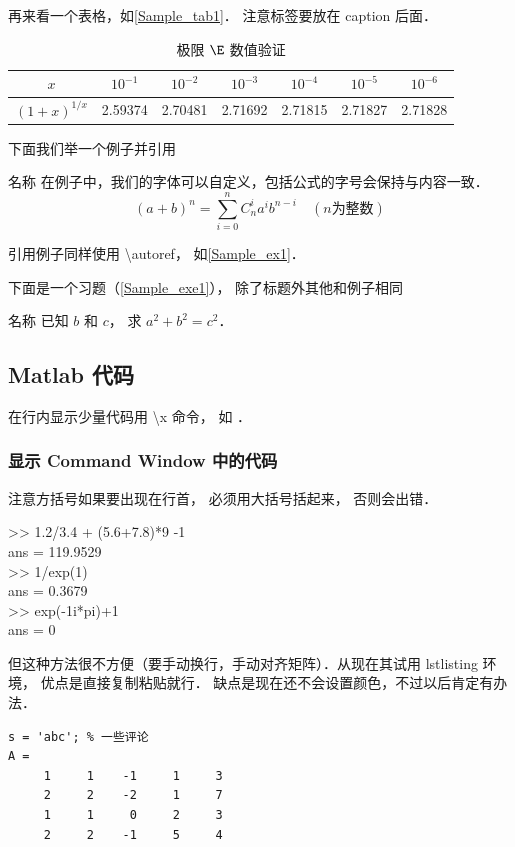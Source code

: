 再来看一个表格，如\autoref{Sample_tab1}． 注意标签要放在 caption 后面．
\begin{table}[ht]
\centering
\caption{极限 $\E$ 数值验证}\label{Sample_tab1}
\begin{tabular}{|c|c|c|c|c|c|c|}
\hline
$x$ & ${10^{ - 1}}$ & ${10^{ - 2}}$ & ${10^{ - 3}}$ & ${10^{ - 4}}$ & ${10^{ - 5}}$ & ${10^{ - 6}}$ \\
\hline
$(1 + x)^{1/x}$ & 2.59374 & 2.70481 & 2.71692 & 2.71815 & 2.71827 & 2.71828 \\
\hline
\end{tabular}
\end{table}

下面我们举一个例子并引用

\begin{exam}{名称}\label{Sample_ex1}
在例子中，我们的字体可以自定义，包括公式的字号会保持与内容一致．
\begin{equation}
(a+b)^n = \sum_{i=0}^n C_n^i a^i b^{n-i} \quad (n\text{为整数})
\end{equation}
\end{exam}
引用例子同样使用 \textbackslash autoref， 如\autoref{Sample_ex1}． 

下面是一个习题（\autoref{Sample_exe1}）， 除了标题外其他和例子相同
\begin{exer}{名称}\label{Sample_exe1}
已知 $b$ 和 $c$， 求 $a^2 + b^2 = c^2$．
\end{exer}

\subsection{Matlab 代码}
在行内显示少量代码用 \textbackslash x 命令， 如 ．
\subsubsection{显示  Command Window 中的代码}
注意方括号如果要出现在行首， 必须用大括号括起来， 否则会出错．
\begin{Command}
>> 1.2/3.4 + (5.6+7.8)*9 -1 \\
ans = 119.9529 \\
>> 1/exp(1) \\
ans = 0.3679 \\
>> exp(-1i*pi)+1 \\
ans = 0
\end{Command}

但这种方法很不方便（要手动换行，手动对齐矩阵）．从现在其试用 lstlisting 环境， 优点是直接复制粘贴就行． 缺点是现在还不会设置颜色，不过以后肯定有办法．
\begin{lstlisting}[language=plain]
s = 'abc'; % 一些评论
A =
     1     1    -1     1     3
     2     2    -2     1     7
     1     1     0     2     3
     2     2    -1     5     4
\end{lstlisting}

